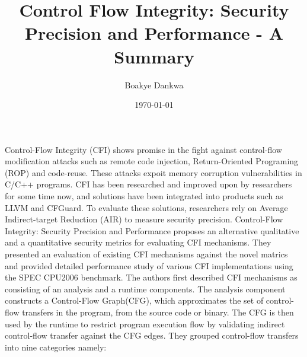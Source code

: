 \documentclass[dvips,12pt]{article}
\begin{document}

\title{Control Flow Integrity: Security Precision and Performance - A Summary}
\author{Boakye Dankwa}
\date{\today}



\maketitle


Control-Flow Integrity (CFI) shows promise in the fight against control-flow modification attacks such as remote code injection, Return-Oriented Programing (ROP) and code-reuse. These attacks expoit memory corruption vulnerabilities in C/C++ programs. CFI has been researched and improved upon by researchers for some time now, and solutions have been integrated into products such as LLVM and CFGuard. To evaluate these solutions, researchers rely on Average Indirect-target Reduction (AIR) to measure security precision. Control-Flow Integrity: Security Precision and Performance \cite{DBLP:journals/corr/BurowCBPNLF16} proposes an alternative qualitative and a quantitative security metrics for evaluating CFI mechanisms. They presented an evaluation of existing CFI mechanisms against the novel matrics and provided detailed performance study of various CFI implementations using the SPEC CPU2006 benchmark.
\newline
\newline
The authors first described CFI mechanisms as consisting of an analysis and a runtime components. The analysis component constructs a Control-Flow Graph(CFG), which approximates the set of control-flow transfers in the program, from the source code or binary. The CFG is then used by the runtime to restrict program execution flow by validating indirect control-flow transfer against the CFG edges. They grouped control-flow transfers into nine categories namely:
\newline
\end{document}
